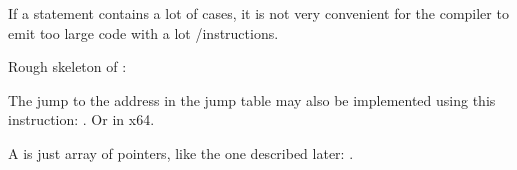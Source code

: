 
If a  statement contains a lot of cases, it is not very convenient for the compiler to emit too large code
with a lot \JE/\JNE instructions.







\subsectionold{\Conclusion{}}

Rough skeleton of :



The jump to the address in the jump table may also be implemented using this instruction: .
Or  in x64.

A  is just array of pointers, like the one described later: .
